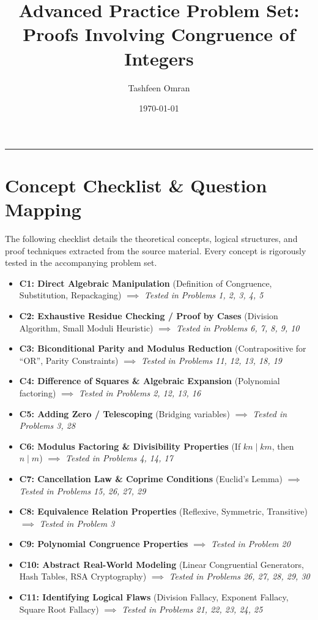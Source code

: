 \documentclass{article}
\title{\textbf{Advanced Practice Problem Set: \\ Proofs Involving Congruence of Integers}}
\author{Tashfeen Omran}
\date{\today}
\begin{document}
\maketitle

\tableofcontents
\vspace{1cm}

\hrule
\vspace{0.5cm}

\section{Concept Checklist \& Question Mapping}
\label{sec:checklist_start}
The following checklist details the theoretical concepts, logical structures, and proof techniques extracted from the source material. Every concept is rigorously tested in the accompanying problem set.

\begin{itemize}
    \item \textbf{C1: Direct Algebraic Manipulation} (Definition of Congruence, Substitution, Repackaging) $\implies$ \textit{Tested in Problems 1, 2, 3, 4, 5}
    \item \textbf{C2: Exhaustive Residue Checking / Proof by Cases} (Division Algorithm, Small Moduli Heuristic) $\implies$ \textit{Tested in Problems 6, 7, 8, 9, 10}
    \item \textbf{C3: Biconditional Parity and Modulus Reduction} (Contrapositive for ``OR'', Parity Constraints) $\implies$ \textit{Tested in Problems 11, 12, 13, 18, 19}
    \item \textbf{C4: Difference of Squares \& Algebraic Expansion} (Polynomial factoring) $\implies$ \textit{Tested in Problems 2, 12, 13, 16}
    \item \textbf{C5: Adding Zero / Telescoping} (Bridging variables) $\implies$ \textit{Tested in Problems 3, 28}
    \item \textbf{C6: Modulus Factoring \& Divisibility Properties} (If $kn \mid km$, then $n \mid m$) $\implies$ \textit{Tested in Problems 4, 14, 17}
    \item \textbf{C7: Cancellation Law \& Coprime Conditions} (Euclid's Lemma) $\implies$ \textit{Tested in Problems 15, 26, 27, 29}
    \item \textbf{C8: Equivalence Relation Properties} (Reflexive, Symmetric, Transitive) $\implies$ \textit{Tested in Problem 3}
    \item \textbf{C9: Polynomial Congruence Properties} $\implies$ \textit{Tested in Problem 20}
    \item \textbf{C10: Abstract Real-World Modeling} (Linear Congruential Generators, Hash Tables, RSA Cryptography) $\implies$ \textit{Tested in Problems 26, 27, 28, 29, 30}
    \item \textbf{C11: Identifying Logical Flaws} (Division Fallacy, Exponent Fallacy, Square Root Fallacy) $\implies$ \textit{Tested in Problems 21, 22, 23, 24, 25}
\end{itemize}
\end{document}

